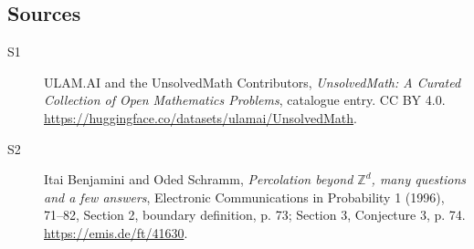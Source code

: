 \documentclass[11pt]{article}
\begin{document}
\subsection{Sources}
\begin{description}
\item[\hypertarget{source:statement:1}{S1}] ULAM.AI and the UnsolvedMath Contributors, \emph{UnsolvedMath: A Curated Collection of Open Mathematics Problems}, catalogue entry. CC BY 4.0. \url{https://huggingface.co/datasets/ulamai/UnsolvedMath}.
\item[\hypertarget{source:statement:2}{S2}] Itai Benjamini and Oded Schramm, \emph{Percolation beyond $\mathbb Z^d$, many questions and a few answers}, Electronic Communications in Probability 1 (1996), 71--82, Section 2, boundary definition, p. 73; Section 3, Conjecture 3, p. 74. \url{https://emis.de/ft/41630}.
\end{description}
\label{end:statement}
\end{document}
